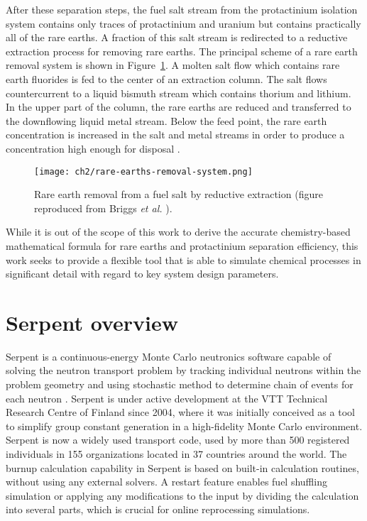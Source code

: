 After these separation steps, the fuel salt stream from the protactinium 
isolation system contains only traces of protactinium and uranium but contains 
practically all of the rare earths. A fraction of this salt stream is 
redirected to a reductive extraction process for removing rare earths.  The 
principal scheme of a rare earth removal system is shown in  
Figure~\ref{fig:rare-earth-removal}. A molten salt flow which contains 
rare earth fluorides is fed to the center of an extraction column. The salt 
flows countercurrent to a liquid bismuth stream which contains thorium and 
lithium. In the upper part of the column, the rare earths are reduced and 
transferred to the downflowing liquid metal stream. Below the feed point, the 
rare earth concentration is increased in the salt and metal streams in order 
to produce a concentration high enough for disposal 
\cite{briggs_molten-salt_1969}.
\begin{figure}[htbp!]
	\centering
	\texttt{[image: ch2/rare-earths-removal-system.png]}
	\caption{Rare earth removal from a fuel salt by reductive extraction 
		(figure reproduced from Briggs \emph{et al.} 
		\cite{briggs_molten-salt_1969}).}
	\label{fig:rare-earth-removal}
\end{figure}

While it is out of the scope of this work to derive the accurate  
chemistry-based mathematical formula for rare earths and protactinium 
separation efficiency, this work seeks to provide a flexible tool that is able 
to simulate chemical processes in significant detail with regard to key system 
design parameters.

\section{Serpent overview}
Serpent is a continuous-energy Monte Carlo neutronics software capable of 
solving the neutron transport problem by tracking individual neutrons within 
the problem geometry and using stochastic method to determine chain of events 
for each neutron \cite{leppanen_serpent_2014}. Serpent is under active 
development at the VTT Technical Research Centre of Finland since 2004, where 
it was initially conceived as a tool to simplify group constant generation in 
a high-fidelity Monte Carlo environment. Serpent is now a widely used  
transport code, used by more than 500 registered individuals in 155 
organizations located in 37 countries around the world. The burnup calculation 
capability in Serpent is based on built-in calculation routines, without using 
any external solvers. A restart feature enables fuel shuffling simulation or 
applying any modifications to the input by dividing the calculation into 
several parts, which is crucial for online reprocessing simulations.

